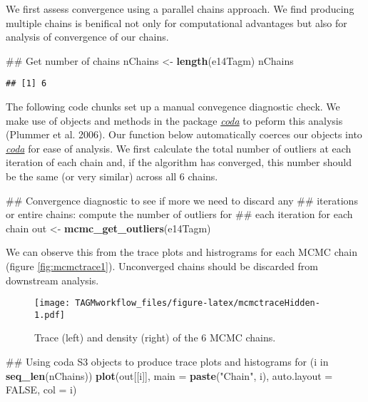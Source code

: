 \documentclass[]{article}
\newenvironment{Shaded}{\begin{snugshade}}{\end{snugshade}}
\newcommand{\KeywordTok}[1]{\textcolor[rgb]{0.13,0.29,0.53}{\textbf{{#1}}}}
\newcommand{\DataTypeTok}[1]{\textcolor[rgb]{0.13,0.29,0.53}{{#1}}}
\newcommand{\StringTok}[1]{\textcolor[rgb]{0.31,0.60,0.02}{{#1}}}
\newcommand{\OtherTok}[1]{\textcolor[rgb]{0.56,0.35,0.01}{{#1}}}
\newcommand{\NormalTok}[1]{{#1}}
\begin{document}
We first assess convergence using a parallel chains approach. We find
producing multiple chains is benifical not only for computational
advantages but also for analysis of convergence of our chains.

\begin{Shaded}
\begin{Highlighting}[]
\NormalTok{## Get number of chains}
\NormalTok{nChains <-}\StringTok{ }\KeywordTok{length}\NormalTok{(e14Tagm)}
\NormalTok{nChains}
\end{Highlighting}
\end{Shaded}

\begin{verbatim}
## [1] 6
\end{verbatim}

The following code chunks set up a manual convegence diagnostic check.
We make use of objects and methods in the package
\emph{\href{https://CRAN.R-project.org/package=coda}{coda}} to peform
this analysis (Plummer et al. 2006). Our function below automatically
coerces our objects into
\emph{\href{https://CRAN.R-project.org/package=coda}{coda}} for ease of
analysis. We first calculate the total number of outliers at each
iteration of each chain and, if the algorithm has converged, this number
should be the same (or very similar) across all 6 chains.

\begin{Shaded}
\begin{Highlighting}[]
\NormalTok{## Convergence diagnostic to see if more we need to discard any}
\NormalTok{## iterations or entire chains: compute the number of outliers for}
\NormalTok{## each iteration for each chain}
\NormalTok{out <-}\StringTok{ }\KeywordTok{mcmc_get_outliers}\NormalTok{(e14Tagm)}
\end{Highlighting}
\end{Shaded}

We can observe this from the trace plots and histrograms for each MCMC
chain (figure \ref{fig:mcmctrace1}). Unconverged chains should be
discarded from downstream analysis.

\begin{figure}[htbp]
\centering
\texttt{[image: TAGMworkflow\_files/figure-latex/mcmctraceHidden-1.pdf]}
\caption{\label{fig:mcmctraceHidden}Trace (left) and density (right) of the
6 MCMC chains.}
\end{figure}

\begin{Shaded}
\begin{Highlighting}[]
\NormalTok{## Using coda S3 objects to produce trace plots and histograms}
\NormalTok{for (i in }\KeywordTok{seq_len}\NormalTok{(nChains))}
    \KeywordTok{plot}\NormalTok{(out[[i]], }\DataTypeTok{main =} \KeywordTok{paste}\NormalTok{(}\StringTok{"Chain"}\NormalTok{, i), }\DataTypeTok{auto.layout =} \OtherTok{FALSE}\NormalTok{, }\DataTypeTok{col =} \NormalTok{i)}
\end{Highlighting}
\end{Shaded}
\end{document}
